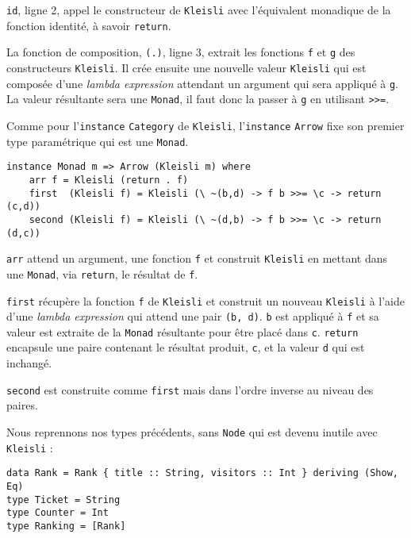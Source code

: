 \documentclass{llncs}
\begin{document}
\lstinline{id}, ligne 2, appel le constructeur de \lstinline{Kleisli} avec
l'équivalent monadique de la fonction identité, à savoir \lstinline{return}.

La fonction de composition, \lstinline{(.)}, ligne 3, extrait les fonctions
\lstinline{f} et \lstinline{g} des constructeurs \lstinline{Kleisli}.
Il crée ensuite une nouvelle valeur \lstinline{Kleisli} qui est composée d'une
\emph{lambda expression} attendant un argument qui sera appliqué à \lstinline{g}.
La valeur résultante sera une \lstinline{Monad}, il faut donc la passer à \lstinline{g}
en utilisant \lstinline{>>=}.

Comme pour l'\lstinline{instance} \lstinline{Category} de \lstinline{Kleisli},
l'\lstinline{instance} \lstinline{Arrow} fixe son premier type paramétrique qui
est une \lstinline{Monad}.
\begin{lstlisting}
instance Monad m => Arrow (Kleisli m) where
    arr f = Kleisli (return . f)
    first  (Kleisli f) = Kleisli (\ ~(b,d) -> f b >>= \c -> return (c,d))
    second (Kleisli f) = Kleisli (\ ~(d,b) -> f b >>= \c -> return (d,c))
\end{lstlisting}
\lstinline{arr} attend un argument, une fonction \lstinline{f} et construit
\lstinline{Kleisli} en mettant dans une \lstinline{Monad}, via \lstinline{return},
le résultat de \lstinline{f}.

\lstinline{first} récupère la fonction \lstinline{f} de \lstinline{Kleisli} et
construit un nouveau \lstinline{Kleisli} à l'aide d'une \emph{lambda expression}
qui attend une pair \lstinline{(b, d)}.
\lstinline{b} est appliqué à \lstinline{f} et sa valeur est extraite de la
\lstinline{Monad} résultante pour être placé dans \lstinline{c}.
\lstinline{return} encapsule une paire contenant le résultat produit,
\lstinline{c}, et la valeur \lstinline{d} qui est inchangé.

\lstinline{second} est construite comme \lstinline{first} mais dans l'ordre inverse
au niveau des paires.

Nous reprennons nos types précédents, sans \lstinline{Node} qui est devenu
inutile avec \lstinline{Kleisli} :
\begin{lstlisting}
data Rank = Rank { title :: String, visitors :: Int } deriving (Show, Eq)
type Ticket = String
type Counter = Int
type Ranking = [Rank]
\end{lstlisting}
\end{document}
